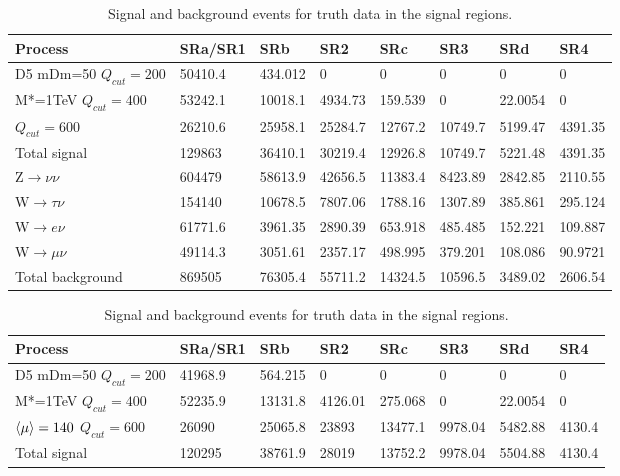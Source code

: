 \begin{landscape}
\begin{table}[ht]
\begin{center}
\begin{tabular}{|l|l|l|l|l|l|l|l|}
\hline
Process & SRa/SR1  & SRb & SR2 & SRc & SR3 & SRd & SR4 \\ \hline
D5 mDm=50 $Q_{cut}=200$ & 50410.4 & 434.012 & 0 & 0 & 0 & 0 & 0 \\
M*=1TeV $Q_{cut}=400$ & 53242.1 & 10018.1 & 4934.73 & 159.539 & 0 & 22.0054 & 0 \\
$Q_{cut}=600$ & 26210.6 & 25958.1 & 25284.7 & 12767.2 & 10749.7 & 5199.47 & 4391.35 \\ \hline
Total signal & 129863 & 36410.1 & 30219.4 & 12926.8 & 10749.7 & 5221.48 & 4391.35 \\ \hline

Z$\rightarrow\nu\nu$ & 604479 & 58613.9 & 42656.5 & 11383.4 & 8423.89 & 2842.85 & 2110.55 \\
W$\rightarrow\tau\nu$ & 154140 & 10678.5 & 7807.06 & 1788.16 & 1307.89 & 385.861 & 295.124 \\
W$\rightarrow e\nu$ & 61771.6 & 3961.35 & 2890.39 & 653.918 & 485.485 & 152.221 & 109.887 \\
W$\rightarrow\mu\nu$ & 49114.3 & 3051.61 & 2357.17 & 498.995 & 379.201 & 108.086 & 90.9721 \\ \hline
Total background & 869505 & 76305.4 & 55711.2 & 14324.5 & 10596.5 & 3489.02 & 2606.54 \\ \hline
\end{tabular}
\caption{Signal and background events for truth data in the signal regions.}
\label{tab:srtruth1}
\end{center}
\vspace*{5px}
\begin{center}
\begin{tabular}{|l|l|l|l|l|l|l|l|}
\hline
Process & SRa/SR1 & SRb & SR2 & SRc & SR3 & SRd & SR4 \\ \hline
D5 mDm=50 $Q_{cut}=200$ & 41968.9 & 564.215 & 0 & 0 & 0 & 0 & 0 \\
M*=1TeV $Q_{cut}=400$ & 52235.9 & 13131.8 & 4126.01 & 275.068 & 0 & 22.0054 & 0 \\
$\left<\mu\right>=140$ $Q_{cut}=600$ & 26090 & 25065.8 & 23893 & 13477.1 & 9978.04 & 5482.88 & 4130.4 \\ \hline
Total signal & 120295 & 38761.9 & 28019 & 13752.2 & 9978.04 & 5504.88 & 4130.4 \\ \hline


\end{tabular}
\end{center}
\end{table}
\end{landscape}
